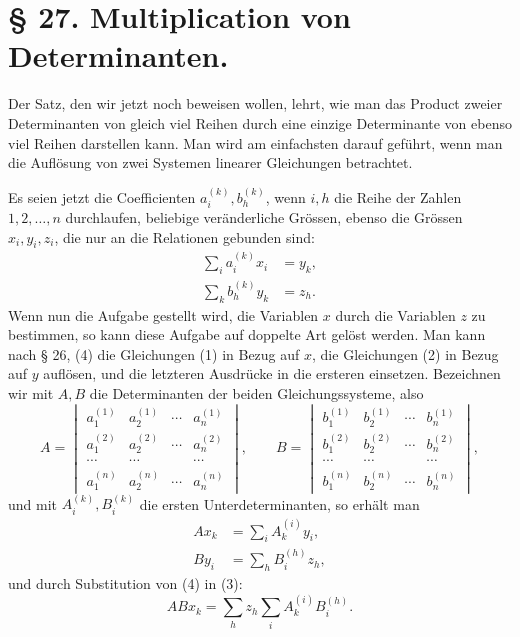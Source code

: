 \documentclass[11pt]{article}
\begin{document}
\section*{§ 27. Multiplication von Determinanten.}

Der Satz, den wir jetzt noch beweisen wollen, lehrt, wie man das Product zweier Determinanten von gleich viel Reihen durch eine einzige Determinante von ebenso viel Reihen darstellen kann. Man wird am einfachsten darauf geführt, wenn man die Auflösung von zwei Systemen linearer Gleichungen betrachtet.

Es seien jetzt die Coefficienten $a_i^{(k)}, b_h^{(k)}$, wenn $i,h$ die Reihe der Zahlen $1,2,\ldots,n$ durchlaufen, beliebige veränderliche Grössen, ebenso die Grössen $x_i,y_i,z_i$, die nur an die Relationen gebunden sind:
\begin{align}
 \sum_i a_i^{(k)}x_i&=y_k,\tag{1}\\
 \sum_k b_h^{(k)}y_k&=z_h.\tag{2}
\end{align}
Wenn nun die Aufgabe gestellt wird, die Variablen $x$ durch die Variablen $z$ zu bestimmen, so kann diese Aufgabe auf doppelte Art gelöst werden. Man kann nach § 26, (4) die Gleichungen (1) in Bezug auf $x$, die Gleichungen (2) in Bezug auf $y$ auflösen, und die letzteren Ausdrücke in die ersteren einsetzen. Bezeichnen wir mit $A,B$ die Determinanten der beiden Gleichungssysteme, also
\[
A=\begin{vmatrix}
 a_1^{(1)}&a_2^{(1)}&\cdots&a_n^{(1)}\\
 a_1^{(2)}&a_2^{(2)}&\cdots&a_n^{(2)}\\
 \cdots&\cdots&&\cdots\\
 a_1^{(n)}&a_2^{(n)}&\cdots&a_n^{(n)}
\end{vmatrix},\qquad
B=\begin{vmatrix}
 b_1^{(1)}&b_2^{(1)}&\cdots&b_n^{(1)}\\
 b_1^{(2)}&b_2^{(2)}&\cdots&b_n^{(2)}\\
 \cdots&\cdots&&\cdots\\
 b_1^{(n)}&b_2^{(n)}&\cdots&b_n^{(n)}
\end{vmatrix},
\]
und mit $A_i^{(k)},B_i^{(k)}$ die ersten Unterdeterminanten, so erhält man
\begin{align}
 A x_k&=\sum_i A_k^{(i)}y_i,\tag{3}\\
 B y_i&=\sum_h B_i^{(h)}z_h,\tag{4}
\end{align}
und durch Substitution von (4) in (3):
\begin{equation}
 ABx_k=\sum_h z_h\sum_i A_k^{(i)}B_i^{(h)}.\tag{5}
\end{equation}
\end{document}
